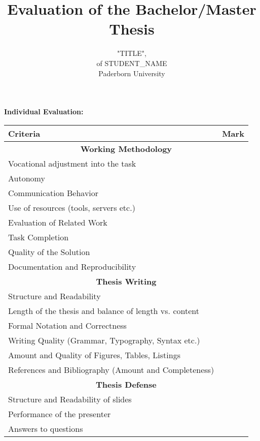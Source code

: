 \documentclass{scrartcl}
\title{Evaluation of the Bachelor/Master Thesis}
\subtitle{"TITLE", \\ of STUDENT\_NAME \\ Paderborn University}
\date{\vspace{-2cm}}
\begin{document}
\maketitle

\textbf{Individual Evaluation:}
\begin{table}[htb!]
\centering
\begin{tabular}{@{}ll@{}}
\toprule
\textbf{Criteria}                                      & \textbf{Mark} \\ \midrule
\multicolumn{2}{c}{\textbf{Working Methodology}}                       \\
Vocational adjustment into the task                    &               \\
Autonomy                                               &               \\
Communication Behavior                                 &               \\
Use of resources (tools, servers etc.)                 &               \\
Evaluation of Related Work                             &               \\
Task Completion                                        &               \\
Quality of the Solution                                &               \\
Documentation and Reproducibility                      &               \\
\multicolumn{2}{c}{\textbf{Thesis Writing}}                             \\
Structure and Readability                              &               \\
Length of the thesis and balance of length vs. content &               \\
Formal Notation and Correctness                        &               \\
Writing Quality (Grammar, Typography, Syntax etc.)     &               \\
Amount and Quality of Figures, Tables, Listings        &               \\
References and Bibliography (Amount and Completeness)  &               \\
\multicolumn{2}{c}{\textbf{Thesis Defense}}                             \\
Structure and Readability of slides                    &               \\
Performance of the presenter                           &               \\
Answers to questions                                   &               \\ \bottomrule
\end{tabular}
\end{table}
\end{document}
